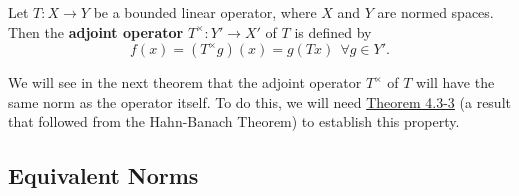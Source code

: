 \begin{definition}
    Let \( T : X \to Y  \) be a bounded linear operator, where \( X  \) and \( Y  \) are normed spaces. Then the \textbf{adjoint operator} \( T^{\times}: Y' \to X' \) of \( T  \) is defined by
    \[  f(x) = (T^{\times}g)(x) = g(Tx) \ \ \forall g \in Y'. \]
\end{definition}

We will see in the next theorem that the adjoint operator \( T^{\times} \) of \( T  \) will have the same norm as the operator itself. To do this, we will need {\hyperref[4.3-3]{Theorem 4.3-3}} (a result that followed from the Hahn-Banach Theorem) to establish this property.

\subsection{Equivalent Norms}

